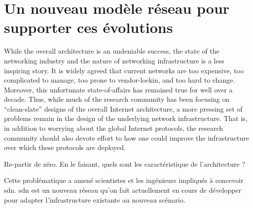 \section{Un nouveau modèle réseau pour supporter ces évolutions}

While the overall architecture is an undeniable success, the state of the networking industry and the nature of networking infrastructure is a less inspiring story. It is widely agreed that current networks are too expensive, too complicated to manage, too prone to vendor-lockin, and too hard to change. Moreover, this unfortunate state-of-affairs has remained true for well over a decade. Thus, while much of the research community has been focusing on “clean-slate” designs of the overall Internet architecture, a more pressing set of problems remain in the design of the underlying network infrastructure. That is, in addition to worrying about the global Internet protocols, the research community should also devote effort to how one could improve the infrastructure over which these protocols are deployed.

Re-partir de zéro. En le faisant, quels sont les caractéristique de l'architecture ?


Cette problématique a amené scientistes et les ingénieurs impliqués à concevoir \gls{sdn}. \gls{sdn} est un nouveau  réseau qu'on fait actuellement en cours de développer pour adapter l'infrastructure existante au nouveau scénario.


